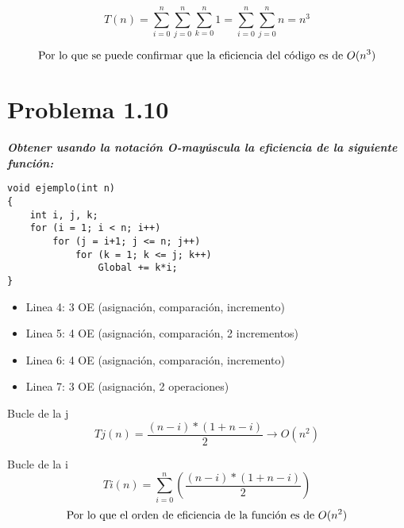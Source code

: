\begin{equation}
	T(n)=\sum_{i=0}^{n}\sum_{j=0}^{n}\sum_{k=0}^{n}1= \sum_{i=0}^{n}\sum_{j=0}^{n}n=n^3
\end{equation}

\begin{equation}
\textup{Por lo que se puede confirmar que la eficiencia del código es de } O(n^3)
\end{equation}


\section{Problema 1.10}
\textbf{\textit{Obtener usando la notación O-mayúscula la eficiencia de la siguiente función:}}
\begin {lstlisting}						
void ejemplo(int n)
{
	int i, j, k;
	for (i = 1; i < n; i++)
		for (j = i+1; j <= n; j++)
			for (k = 1; k <= j; k++)
				Global += k*i;
}
\end{lstlisting}

\begin{itemize}
	\item Linea 4: 3 OE (asignación, comparación, incremento) 
	\item Linea 5: 4 OE (asignación, comparación, 2 incrementos)
	\item Linea 6: 4 OE (asignación, comparación, incremento)
	\item Linea 7: 3 OE (asignación, 2 operaciones)
\end{itemize}
Bucle de la j
\begin{equation}
	Tj (n)= \frac{(n-i)*(1+n-i)}{2} \rightarrow O(n^2)
\end{equation}

Bucle de la i
\begin{equation}
	Ti (n)= \sum_{i=0}^{n}(\frac{(n-i)*(1+n-i)}{2}) 	
\end{equation}
\begin{equation}
	\textup{Por lo que el orden de eficiencia de la función es de }  O(n^2)
\end{equation}

\newpage

